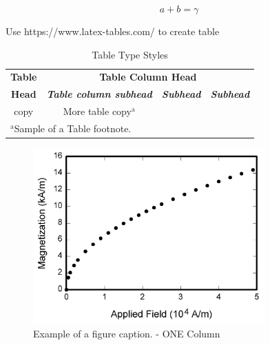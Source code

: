 \documentclass[conference]{IEEEtran}
\begin{document}
\begin{equation}
    a+b=\gamma\label{eq:name}
\end{equation}

Use https://www.latex-tables.com/ to create table

\begin{table}[htbp]
    \caption{Table Type Styles}
    \begin{center}
        \begin{tabular}{|c|c|c|c|}
            \hline
            \textbf{Table} & \multicolumn{3}{|c|}{\textbf{Table Column Head}}                                                         \\
            \cline{2-4}
            \textbf{Head}  & \textbf{\textit{Table column subhead}}           & \textbf{\textit{Subhead}} & \textbf{\textit{Subhead}} \\
            \hline
            copy           & More table copy$^{\mathrm{a}}$                   &                           &                           \\
            \hline
            \multicolumn{4}{l}{$^{\mathrm{a}}$Sample of a Table footnote.}
        \end{tabular}
        \label{tab1e:name}
    \end{center}
\end{table}

\begin{figure}[htbp]
    \includegraphics[width=3.5in]{Photos/fig1.png}
    \caption{Example of a figure caption. - ONE Column}
    \label{fig:name1}
\end{figure}
\end{document}
